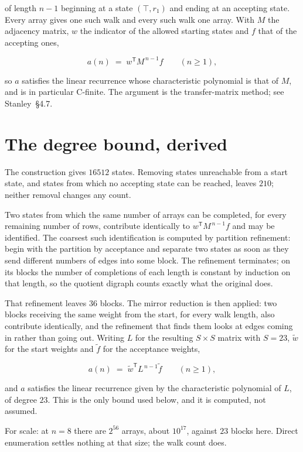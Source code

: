 \documentclass[11pt]{article}
\theoremstyle{definition}
\begin{document}
of length $n-1$ beginning at a state $(\top,r_1)$ and ending at an accepting state. Every array gives one such walk and every such walk one array. With $M$ the adjacency matrix, $w$ the indicator of the allowed starting states and $f$ that of the accepting ones,

\[a(n) \;=\; w^{\mathsf T} M^{\,n-1} f \qquad (n \ge 1),\]

so $a$ satisfies the linear recurrence whose characteristic polynomial is that of $M$, and is in particular C-finite. The argument is the transfer-matrix method; see Stanley~\S4.7.

\section{The degree bound, derived}

The construction gives $16512$ states. Removing states unreachable from a start state, and states from which no accepting state can be reached, leaves $210$; neither removal changes any count.

Two states from which the same number of arrays can be completed, for every remaining number of rows, contribute identically to $w^{\mathsf T}M^{\,n-1}f$ and may be identified. The coarsest such identification is computed by partition refinement: begin with the partition by acceptance and separate two states as soon as they send different numbers of edges into some block. The refinement terminates; on its blocks the number of completions of each length is constant by induction on that length, so the quotient digraph counts exactly what the original does.

That refinement leaves $36$ blocks. The mirror reduction is then applied: two blocks receiving the same weight from the start, for every walk length, also contribute identically, and the refinement that finds them looks at edges coming in rather than going out. Writing $L$ for the resulting $S \times S$ matrix with $S = 23$, $\tilde w$ for the start weights and $\tilde f$ for the acceptance weights,

\[a(n) \;=\; \tilde w^{\mathsf T} L^{\,n-1} \tilde f \qquad (n \ge 1),\]

and $a$ satisfies the linear recurrence given by the characteristic polynomial of $L$, of degree $23$. This is the only bound used below, and it is computed, not assumed.

For scale: at $n = 8$ there are $2^{56}$ arrays, about $10^{17}$, against $23$ blocks here. Direct enumeration settles nothing at that size; the walk count does.
\end{document}
